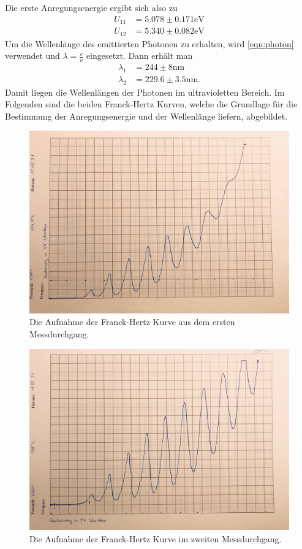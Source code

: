 Die erste Anregungsenergie ergibt sich also zu
\begin{align}
  U_{11}  & = 5.078 \pm 0.171 \si{\electronvolt} \\
  U_{12}  & = 5.340 \pm 0.082 \si{\electronvolt}
  \label{eqn:erstanr}
\end{align}
Um die Wellenlänge des emittierten Photonen zu erhalten, wird \eqref{eqn:photon}
verwendet und $\lambda = \frac{c}{\nu}$ eingesetzt. Dann erhält man
\begin{align}
  \lambda_1 & = 244 \pm 8  \si{\nano\meter} \\
  \lambda_2 & = 229.6 \pm 3.5 \si{\nano\meter}.
  \label{eqn:wellenl}
\end{align}
Damit liegen die Wellenlängen der Photonen im ultravioletten Bereich.
Im Folgenden sind die beiden Franck-Hertz Kurven, welche die Grundlage für die
Bestimmung der Anregungsenergie und der Wellenlänge liefern, abgebildet.
\begin{figure}[H]
  \centering
  \includegraphics[scale=0.25]{content/kurv3.jpeg}
  \caption{Die Aufnahme der Franck-Hertz Kurve aus dem ersten Messdurchgang.}
  \label{fig:franckhertz1}
\end{figure}
\begin{figure}[H]
  \centering
  \includegraphics[scale=0.25]{content/kurve4.jpeg}
  \caption{Die Aufnahme der Franck-Hertz Kurve im zweiten Messdurchgang.}
  \label{fig:franckhertz2}
\end{figure}
